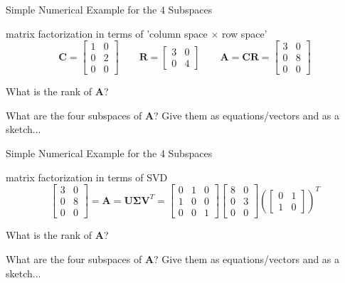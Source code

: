 \documentclass[mathserif, aspectratio=1610]{intbeamer}
\begin{document}
\begin{frame}[t]{Simple Numerical Example for the 4 Subspaces}

matrix factorization in terms of 'column space $\times$ row space'
$$
\bm{C} =
\begin{bmatrix}
1 & 0 \\ 0 & 2 \\ 0 & 0
\end{bmatrix}
\qquad
\bm{R} =
\begin{bmatrix}
3 & 0 \\ 0 & 4
\end{bmatrix}
\qquad
\bm{A} =
\bm{C} \bm{R} =
\begin{bmatrix}
3 & 0 \\ 0 & 8 \\ 0 & 0
\end{bmatrix}
$$

What is the rank of $\bm{A}$?

What are the four subspaces of $\bm{A}$? Give them as equations/vectors and as a sketch...

\end{frame}




\begin{frame}[t]{Simple Numerical Example for the 4 Subspaces}

matrix factorization in terms of SVD
$$
\begin{bmatrix}
3 & 0 \\ 0 & 8 \\ 0 & 0
\end{bmatrix} =
\bm{A} = \bm{U} \bm{\Sigma} \bm{V}^T
=
\begin{bmatrix}
0 & 1 & 0 \\
1 & 0 & 0 \\
0 & 0 & 1
\end{bmatrix}
%
\begin{bmatrix}
8 & 0\\
0 & 3\\
0 & 0
\end{bmatrix}
%
\left(
\begin{bmatrix}
0 & 1\\
1 & 0
\end{bmatrix}
\right)^T
$$

What is the rank of $\bm{A}$?

What are the four subspaces of $\bm{A}$? Give them as equations/vectors and as a sketch...

\end{frame}
\end{document}
